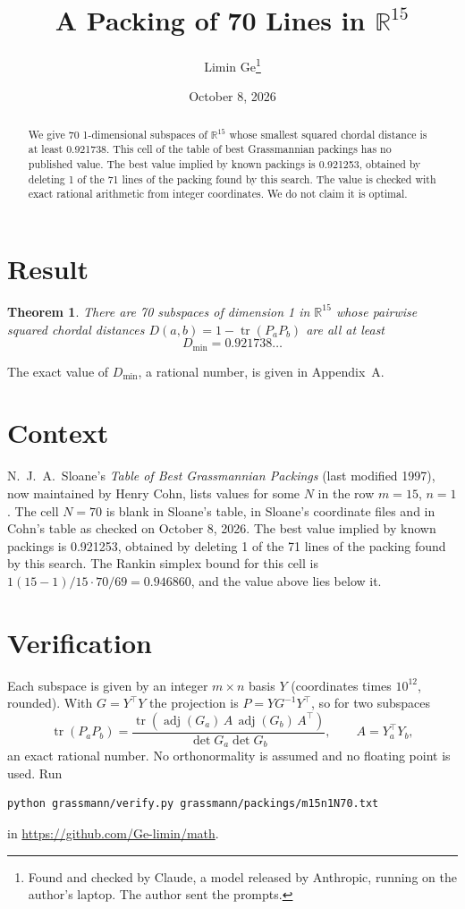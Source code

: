 \documentclass[11pt,a4paper]{article}
\title{A Packing of 70 Lines in $\mathbb{R}^{15}$}
\author{Limin Ge\thanks{Found and checked by Claude, a model released by Anthropic, running on the author's laptop. The author sent the prompts.}}
\date{October 8, 2026}
\newtheorem*{theorem}{Theorem}
\begin{document}
\maketitle
\begin{abstract}
We give 70 1-dimensional subspaces of $\mathbb{R}^{15}$ whose smallest squared chordal distance is at least 0.921738. This cell of the table of best Grassmannian packings has no published value. The best value implied by known packings is 0.921253, obtained by deleting 1 of the 71 lines of the packing found by this search. The value is checked with exact rational arithmetic from integer coordinates. We do not claim it is optimal.
\end{abstract}

\section{Result}
\begin{theorem}
There are 70 subspaces of dimension 1 in $\mathbb{R}^{15}$ whose pairwise squared chordal distances $D(a,b) = 1 - \operatorname{tr}(P_aP_b)$ are all at least
\[ D_{\min} = 0.921738\ldots \]
\end{theorem}
The exact value of $D_{\min}$, a rational number, is given in Appendix~A.


\section{Context}
N.~J.~A.~Sloane's \emph{Table of Best Grassmannian Packings} (last modified 1997), now maintained by Henry Cohn, lists values for some $N$ in the row $m=15$, $n=1$. The cell $N=70$ is blank in Sloane's table, in Sloane's coordinate files and in Cohn's table as checked on October 8, 2026. The best value implied by known packings is 0.921253, obtained by deleting 1 of the 71 lines of the packing found by this search. The Rankin simplex bound for this cell is $1(15-1)/15\cdot 70/69 = 0.946860$, and the value above lies below it.


\section{Verification}
Each subspace is given by an integer $m\times n$ basis $Y$ (coordinates times $10^{12}$, rounded). With $G=Y^\top Y$ the projection is $P=YG^{-1}Y^\top$, so for two subspaces
\[ \operatorname{tr}(P_aP_b)=\frac{\operatorname{tr}(\operatorname{adj}(G_a)\,A\,\operatorname{adj}(G_b)\,A^\top)}{\det G_a\det G_b},\qquad A=Y_a^\top Y_b, \]
an exact rational number. No orthonormality is assumed and no floating point is used. Run
\begin{verbatim}
python grassmann/verify.py grassmann/packings/m15n1N70.txt
\end{verbatim}
in \url{https://github.com/Ge-limin/math}.
\end{document}
